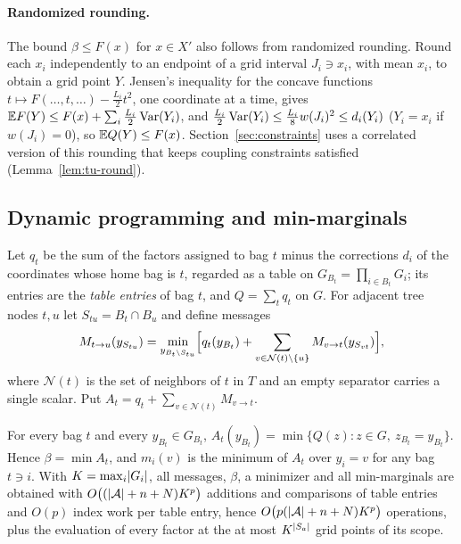 \paragraph{Randomized rounding.}
The bound $\beta\le F(x)$ for $x\in X'$ also follows from randomized
rounding. Round each $x_i$ independently to an endpoint of a grid interval
$J_i\ni x_i$, with mean $x_i$, to obtain a grid point $Y$. Jensen's
inequality for the concave functions $t\mapsto F(\dots,t,\dots)-\frac{L_i}2t^2$,
one coordinate at a time, gives $\mathbb E F(Y)\le F(x)+\sum_i\frac{L_i}2\operatorname{Var}(Y_i)$,
and $\frac{L_i}2\operatorname{Var}(Y_i)\le\frac{L_i}8w(J_i)^2\le d_i(Y_i)$ ($Y_i=x_i$ if
$w(J_i)=0$), so $\mathbb E Q(Y)\le F(x)$. Section~\ref{sec:constraints} uses a
correlated version of this rounding that keeps coupling constraints satisfied
(Lemma~\ref{lem:tu-round}).

\subsection{Dynamic programming and min-marginals}\label{sec:grids-dp}
Let $q_t$ be the sum of the factors assigned to bag $t$ minus the corrections
$d_i$ of the coordinates whose home bag is $t$, regarded as a table on
$G_{B_t}=\prod_{i\in B_t}G_i$; its entries are the \emph{table entries} of bag
$t$, and $Q=\sum_tq_t$ on $G$. For adjacent tree nodes $t,u$ let
$S_{tu}=B_t\cap B_u$ and define messages
\begin{equation}\label{eq:messages}
M_{t\to u}(y_{S_{tu}})=\min_{y_{B_t\setminus S_{tu}}}\Bigl[q_t(y_{B_t})
+\sum_{v\in\mathcal N(t)\setminus\{u\}}M_{v\to t}(y_{S_{vt}})\Bigr],
\end{equation}
where $\mathcal N(t)$ is the set of neighbors of $t$ in $T$ and an empty
separator carries a single scalar. Put
$A_t=q_t+\sum_{v\in\mathcal N(t)}M_{v\to t}$.

\begin{lemma}\label{lem:dp}
For every bag $t$ and every $y_{B_t}\in G_{B_t}$,
$A_t(y_{B_t})=\min\{Q(z):z\in G,\ z_{B_t}=y_{B_t}\}$. Hence $\beta=\min A_t$, and
$m_i(v)$ is the minimum of $A_t$ over $y_i=v$ for any bag $t\ni i$. With
$K=\max_i\lvert G_i\rvert$, all messages, $\beta$, a minimizer and all min-marginals
are obtained with $O\bigl((\lvert \mathcal A\rvert+n+N)K^p\bigr)$ additions and
comparisons of table entries and $O(p)$ index work per table entry, hence
$O\bigl(p(\lvert \mathcal A\rvert+n+N)K^p\bigr)$ operations, plus the evaluation of
every factor at the at most $K^{\lvert S_a\rvert}$ grid points of its scope.
\end{lemma}

